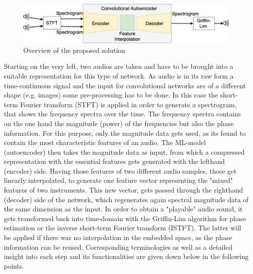 \begin{figure}[htb!]
	\caption{Overview of the proposed solution}
	\label{fig:toolchain}
	\centering
	\includegraphics[width=\textwidth]{images/approach/Toolchain.png}
\end{figure}

Starting on the very left, two audios are taken and have to be brought into a suitable representation for this type of network. As audio is in its raw form a time-continuous signal and the input for convolutional networks are of a different shape (e.g. images) some pre-processing has to be done. In this case the short-term Fourier transform (STFT) is applied in order to generate a spectrogram, that shows the frequency spectra over the time. The frequency spectra contains on the one hand the magnitude (power) of the frequencies but also the phase information. For this purpose, only the magnitude data gets used, as its found to contain the most characteristic features of an audio. The ML-model (autoencoder) then takes the magnitude data as input, from which a compressed representation with the essential features gets generated with the lefthand (encoder) side. Having those features of two different audio samples, those get linearly interpolated, to generate one feature vector representing the "mixed" features of two instruments. This new vector, gets passed through the righthand (decoder) side of the network, which regenerates again spectral magnitude data of the same dimension as the input. In order to obtain a "playable" audio sound, it gets transformed back into time-domain with the Griffin-Lim algorithm \cite{Griffin1984} for phase estimation or the inverse short-term Fourier transform (ISTFT). The latter will be applied if there was no interpolation in the embedded space, as the phase information can be reused. Corresponding terminologies as well as a detailed insight into each step and its functionalities are given down below in the following points.

